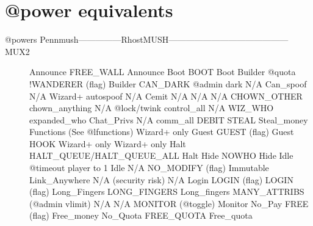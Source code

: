 \documentclass[letterpaper,10pt,english]{sphinxmanual}
\begin{document}
\section{@power equivalents}
\label{\detokenize{31-comparison:power-equivalents}}\begin{description}
\item[{@powers Pennmush—————\sphinxhyphen{}RhostMUSH——————————————MUX2}] \leavevmode
\sphinxAtStartPar
Announce                FREE\_WALL                                          Announce
Boot                    BOOT                                               Boot
Builder                 @quota !WANDERER (flag)                            Builder
CAN\_DARK                @admin  dark                   N/A
Can\_spoof               N/A \sphinxhyphen{} Wizard+ auto\sphinxhyphen{}spoof                           N/A
Cemit                   N/A                                                N/A
N/A                     CHOWN\_OTHER                                        chown\_anything
N/A                     @lock/twink                                        control\_all
N/A                     WIZ\_WHO                                            expanded\_who
Chat\_Privs              N/A                                                comm\_all
DEBIT                   STEAL                                              Steal\_money
Functions               (See @lfunctions)                                  Wizard+ only
Guest                   GUEST (flag)                                       Guest
HOOK                    Wizard+ only                                       Wizard+ only
Halt                    HALT\_QUEUE/HALT\_QUEUE\_ALL                          Halt
Hide                    NOWHO                                              Hide
Idle                    @timeout player to \sphinxhyphen{}1                              Idle
N/A                     NO\_MODIFY (flag)                                   Immutable
Link\_Anywhere           N/A (security risk)                                N/A
Login                   LOGIN (flag)                                       LOGIN (flag)
Long\_Fingers            LONG\_FINGERS                                       Long\_fingers
MANY\_ATTRIBS            (@admin vlimit)                                    N/A
N/A                     MONITOR (@toggle)                                  Monitor
No\_Pay                  FREE (flag)                                        Free\_money
No\_Quota                FREE\_QUOTA                                         Free\_quota

\end{description}
\end{document}
